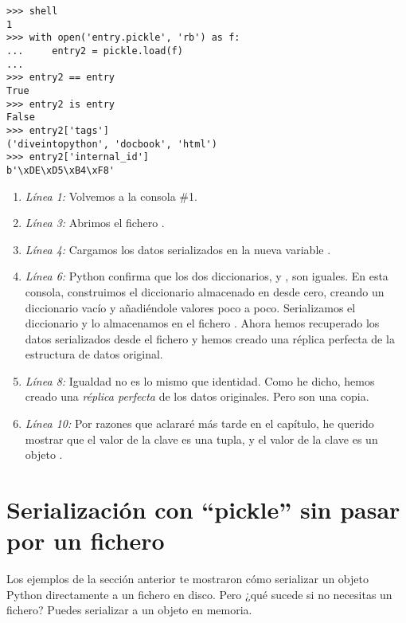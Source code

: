 \noindent\begin{minipage}{\textwidth}
\begin{lstlisting}[mathescape=True]
>>> shell
1
>>> with open('entry.pickle', 'rb') as f:
...     entry2 = pickle.load(f)
... 
>>> entry2 == entry
True
>>> entry2 is entry
False
>>> entry2['tags']
('diveintopython', 'docbook', 'html')
>>> entry2['internal_id']
b'\xDE\xD5\xB4\xF8'
\end{lstlisting}
\end{minipage}

\begin{enumerate}

\item \emph{Línea 1:} Volvemos a la consola \#1.

\item \emph{Línea 3:} Abrimos el fichero .

\item \emph{Línea 4:} Cargamos los datos serializados en la nueva variable .

\item \emph{Línea 6:} Python confirma que los dos diccionarios,  y , son iguales. En esta consola, construimos el diccionario almacenado en  desde cero, creando un diccionario vacío y añadiéndole valores poco a poco. Serializamos el diccionario y lo almacenamos en el fichero . Ahora hemos recuperado los datos serializados desde el fichero y hemos creado una réplica perfecta de la estructura de datos original.

\item \emph{Línea 8:} Igualdad no es lo mismo que identidad. Como he dicho, hemos creado una \emph{réplica perfecta} de los datos originales. Pero son una copia.

\item \emph{Línea 10:} Por razones que aclararé más tarde en el capítulo, he querido mostrar que el valor de la clave  es una tupla, y el valor de la clave  es un objeto .

\end{enumerate}

\section{Serialización con ``pickle'' sin pasar por un fichero}

Los ejemplos de la sección anterior te mostraron cómo serializar un objeto Python directamente a un fichero en disco. Pero ¿qué sucede si no necesitas un fichero? Puedes serializar a un objeto  en memoria.

